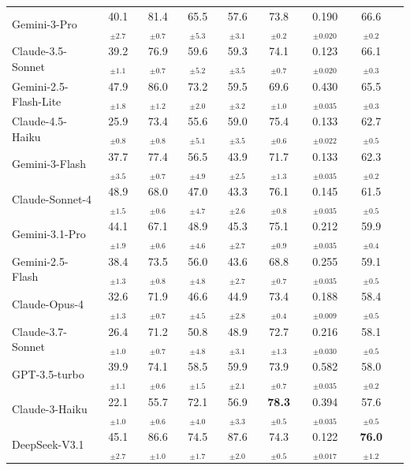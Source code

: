 \begin{table}[t]
{\begin{tabular}{@{}l cccc c cc c@{}}
\rowcolor{blue!5} Gemini-3-Pro & 40.1$_{\pm2.7}$ & 81.4$_{\pm0.7}$ & 65.5$_{\pm5.3}$ & 57.6$_{\pm3.1}$ & 73.8$_{\pm0.2}$ & 0.190$_{\pm0.020}$ & 66.6$_{\pm0.2}$ \\
\rowcolor{blue!5} Claude-3.5-Sonnet & 39.2$_{\pm1.1}$ & 76.9$_{\pm0.7}$ & 59.6$_{\pm5.2}$ & 59.3$_{\pm3.5}$ & 74.1$_{\pm0.7}$ & 0.123$_{\pm0.020}$ & 66.1$_{\pm0.3}$ \\
\rowcolor{blue!5} Gemini-2.5-Flash-Lite & 47.9$_{\pm1.8}$ & 86.0$_{\pm1.2}$ & 73.2$_{\pm2.0}$ & 59.5$_{\pm3.2}$ & 69.6$_{\pm1.0}$ & 0.430$_{\pm0.035}$ & 65.5$_{\pm0.3}$ \\
\rowcolor{blue!5} Claude-4.5-Haiku & 25.9$_{\pm0.8}$ & 73.4$_{\pm0.8}$ & 55.6$_{\pm5.1}$ & 59.0$_{\pm3.5}$ & 75.4$_{\pm0.6}$ & 0.133$_{\pm0.022}$ & 62.7$_{\pm0.5}$ \\
\rowcolor{blue!5} Gemini-3-Flash & 37.7$_{\pm3.5}$ & 77.4$_{\pm0.7}$ & 56.5$_{\pm4.9}$ & 43.9$_{\pm2.5}$ & 71.7$_{\pm1.3}$ & 0.133$_{\pm0.035}$ & 62.3$_{\pm0.2}$ \\
\rowcolor{blue!5} Claude-Sonnet-4 & 48.9$_{\pm1.5}$ & 68.0$_{\pm0.6}$ & 47.0$_{\pm4.7}$ & 43.3$_{\pm2.6}$ & 76.1$_{\pm0.8}$ & 0.145$_{\pm0.035}$ & 61.5$_{\pm0.5}$ \\
\rowcolor{blue!5} Gemini-3.1-Pro & 44.1$_{\pm1.9}$ & 67.1$_{\pm0.6}$ & 48.9$_{\pm4.6}$ & 45.3$_{\pm2.7}$ & 75.1$_{\pm0.9}$ & 0.212$_{\pm0.035}$ & 59.9$_{\pm0.4}$ \\
\rowcolor{blue!5} Gemini-2.5-Flash & 38.4$_{\pm1.3}$ & 73.5$_{\pm0.8}$ & 56.0$_{\pm4.8}$ & 43.6$_{\pm2.7}$ & 68.8$_{\pm0.7}$ & 0.255$_{\pm0.035}$ & 59.1$_{\pm0.5}$ \\
\rowcolor{blue!5} Claude-Opus-4 & 32.6$_{\pm1.3}$ & 71.9$_{\pm0.7}$ & 46.6$_{\pm4.5}$ & 44.9$_{\pm2.8}$ & 73.4$_{\pm0.4}$ & 0.188$_{\pm0.009}$ & 58.4$_{\pm0.5}$ \\
\rowcolor{blue!5} Claude-3.7-Sonnet & 26.4$_{\pm1.0}$ & 71.2$_{\pm0.7}$ & 50.8$_{\pm4.8}$ & 48.9$_{\pm3.1}$ & 72.7$_{\pm1.3}$ & 0.216$_{\pm0.030}$ & 58.1$_{\pm0.5}$ \\
\rowcolor{blue!5} GPT-3.5-turbo & 39.9$_{\pm1.1}$ & 74.1$_{\pm0.6}$ & 58.5$_{\pm1.5}$ & 59.9$_{\pm2.1}$ & 73.9$_{\pm0.7}$ & 0.582$_{\pm0.035}$ & 58.0$_{\pm0.2}$ \\
\rowcolor{blue!5} Claude-3-Haiku & 22.1$_{\pm1.0}$ & 55.7$_{\pm0.6}$ & 72.1$_{\pm4.0}$ & 56.9$_{\pm3.3}$ & \textbf{78.3$_{\pm0.5}$} & 0.394$_{\pm0.035}$ & 57.6$_{\pm0.5}$ \\
\midrule
\rowcolor{green!5} DeepSeek-V3.1 & 45.1$_{\pm2.7}$ & 86.6$_{\pm1.0}$ & 74.5$_{\pm1.7}$ & 87.6$_{\pm2.0}$ & 74.3$_{\pm0.5}$ & 0.122$_{\pm0.017}$ & \textbf{76.0$_{\pm1.2}$} \\

\end{tabular}}
\end{table}
